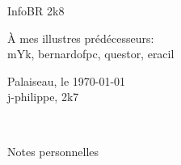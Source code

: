 \thispagestyle{empty}

\begin{center}
\begin{Huge}
InfoBR 2k8
\end{Huge}
\end{center}


\begin{flushright}
\begin{large} 
 { \selectfont
\`A mes illustres prédécesseurs:\\
\smallskip
mYk, bernardofpc, questor, eracil \\ }
\end{large}
\vspace{1cm}
{Palaiseau, le \today \\
\medskip
 j-philippe, 2k7  }
\end{flushright} 


\newpage

\thispagestyle{plain}


\hrulefill \, \begin{Large}Notes personnelles\end{Large} \hrulefill